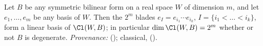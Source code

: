 Let $B$ be any symmetric bilinear form on a real space $W$ of dimension $m$, and let $e_1, \dots, e_m$ be any basis of $W$. Then the $2^m$ blades $e_I = e_{i_1} \cdots e_{i_k}$, $I = \{i_1 < \dots < i_k\}$, form a linear basis of $\Cl(W, B)$; in particular $\dim \Cl(W,B) = 2^m$ whether or not $B$ is degenerate. \emph{Provenance:} \cite[Lem.~2.6]{ButlerT4} (); classical, \cite{Chevalley1997} ().
